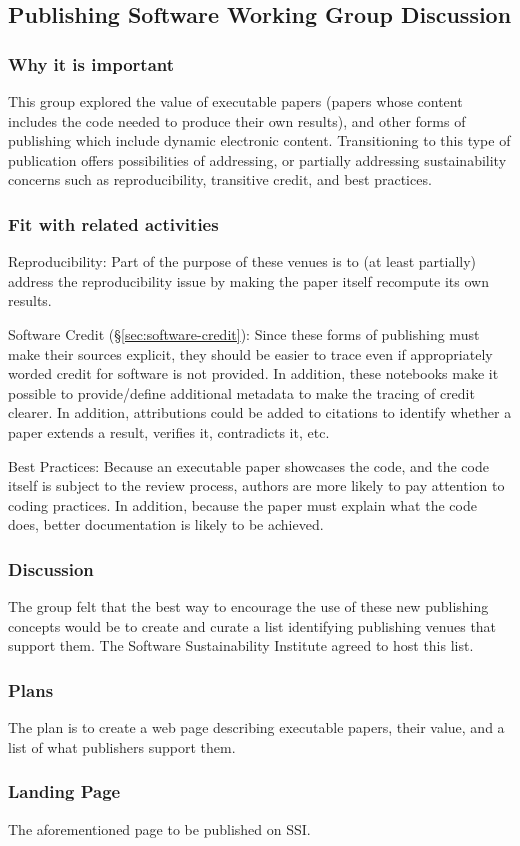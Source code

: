 \subsection{Publishing Software Working Group Discussion} \label{sec:publishing-software}

\subsubsection{Why it is important}

This group explored the value of executable papers (papers whose content includes
the code needed to produce their own results), and other forms of publishing which
include dynamic electronic content. Transitioning to this type of publication offers
possibilities of addressing, or partially addressing sustainability concerns 
such as reproducibility, transitive credit, and best practices.

\subsubsection{Fit with related activities}

Reproducibility: Part of the purpose of these venues is to (at least partially)
address the reproducibility issue by making the paper itself recompute its own
results.

Software Credit (\S\ref{sec:software-credit}):
Since these forms of publishing must make their sources explicit,
they should be easier to trace even if appropriately worded credit for software
is not provided. In addition, these notebooks make it possible to provide/define
additional metadata to make the tracing of credit clearer. In addition, attributions
could be added to citations to identify whether a paper extends a result, verifies it,
contradicts it, etc.

Best Practices: Because an executable paper showcases the code, and the code itself
is subject to the review process, authors are more likely to pay attention to coding
practices. In addition, because the paper must explain what the code does, better
documentation is likely to be achieved.

\subsubsection{Discussion}

The group felt that the best way to encourage the use of these new publishing
concepts would be to create and curate a list identifying publishing venues
that support them. The Software Sustainability Institute agreed to host this list.

\subsubsection{Plans}

The plan is to create a web page describing executable papers, their value, and
a list of what publishers support them.

\subsubsection{Landing Page}

The aforementioned page to be published on SSI.
